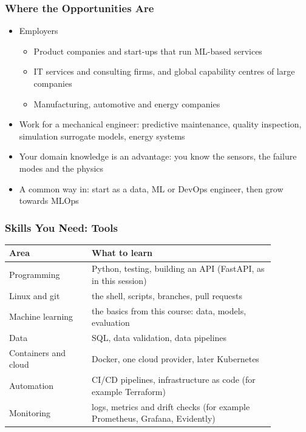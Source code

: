 \begin{frame}[fragile]\frametitle{Where the Opportunities Are}
\begin{itemize}
\item Employers
\begin{itemize}
\item Product companies and start-ups that run ML-based services
\item IT services and consulting firms, and global capability centres of large companies
\item Manufacturing, automotive and energy companies
\end{itemize}
\item Work for a mechanical engineer: predictive maintenance, quality inspection, simulation surrogate models, energy systems
\item Your domain knowledge is an advantage: you know the sensors, the failure modes and the physics
\item A common way in: start as a data, ML or DevOps engineer, then grow towards MLOps
\end{itemize}
\end{frame}

\begin{frame}[fragile]\frametitle{Skills You Need: Tools}
\begin{center}
\small\renewcommand{\arraystretch}{1.35}
\begin{tabular}{>{\raggedright\arraybackslash}p{0.27\linewidth}>{\raggedright\arraybackslash}p{0.6\linewidth}}
\hline
\textbf{Area} & \textbf{What to learn} \\
\hline
Programming & Python, testing, building an API (FastAPI, as in this session) \\
Linux and git & the shell, scripts, branches, pull requests \\
Machine learning & the basics from this course: data, models, evaluation \\
Data & SQL, data validation, data pipelines \\
Containers and cloud & Docker, one cloud provider, later Kubernetes \\
Automation & CI/CD pipelines, infrastructure as code (for example Terraform) \\
Monitoring & logs, metrics and drift checks (for example Prometheus, Grafana, Evidently) \\
\hline
\end{tabular}
\end{center}
\end{frame}

